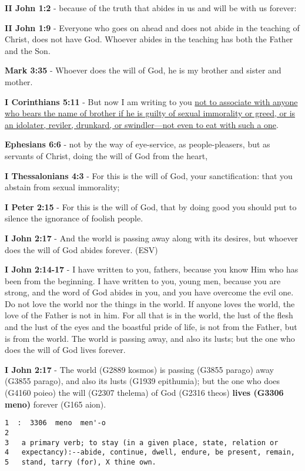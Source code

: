 \documentclass[11pt]{article}
\begin{document}
\textbf{II John 1:2} - because of the truth that abides in us and will be with us forever:

\textbf{II John 1:9} - Everyone who goes on ahead and does not abide in the teaching of Christ, does not have God. Whoever abides in the teaching has both the Father and the Son.

\textbf{Mark 3:35} - Whoever does the will of God, he is my brother and sister and mother.

\textbf{I Corinthians 5:11} - But now I am writing to you \uline{not to associate with anyone who bears the name of brother if he is guilty of sexual immorality or greed, or is an idolater, reviler, drunkard, or swindler—not even to eat with such a one}.

\textbf{Ephesians 6:6} - not by the way of eye-service, as people-pleasers, but as servants of Christ, doing the will of God from the heart,

\textbf{I Thessalonians 4:3} - For this is the will of God, your sanctification: that you abstain from sexual immorality;

\textbf{I Peter 2:15} - For this is the will of God, that by doing good you should put to silence the ignorance of foolish people.

\textbf{I John 2:17} - And the world is passing away along with its desires, but whoever does the will of God abides forever. (ESV)

\textbf{I John 2:14-17} - I have written to you, fathers, because you know Him who has been from the beginning. I have written to you, young men, because you are strong, and the word of God abides in you, and you have overcome the evil one.  Do not love the world nor the things in the world. If anyone loves the world, the love of the Father is not in him.  For all that is in the world, the lust of the flesh and the lust of the eyes and the boastful pride of life, is not from the Father, but is from the world.  The world is passing away, and also its lusts; but the one who does the will of God lives forever.

\textbf{I John 2:17} - The world (G2889 kosmos) is passing (G3855 parago) away (G3855 parago), and also its lusts (G1939 epithumia); but the one who does (G4160 poieo) the will (G2307 thelema) of God (G2316 theos) \textbf{lives (G3306 meno)} forever (G165 aion).

\begin{verbatim}
1  :  3306  meno  men'-o
2  
3   a primary verb; to stay (in a given place, state, relation or
4   expectancy):--abide, continue, dwell, endure, be present, remain,
5   stand, tarry (for), X thine own.
\end{verbatim}
\end{document}
